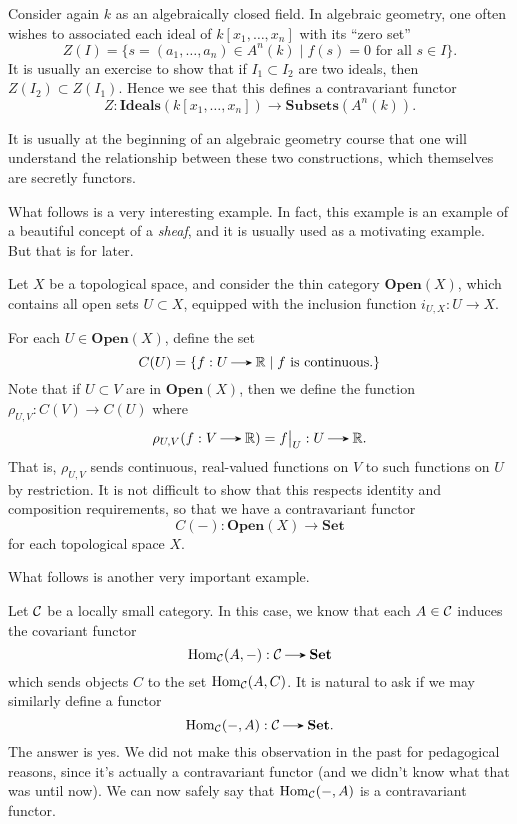     \begin{example}
        Consider again $k$ as an algebraically closed field. In algebraic geometry, 
        one often wishes to associated each ideal of $k[x_1, \dots, x_n]$
        with its ``zero set'' 
        \[
            Z(I) = \bigg\{s = (a_1, \dots, a_n) \in A^n(k) \;\bigg|\; f(s) = 0 \text{ for all } s \in I\bigg\}.
        \]
        It is usually an exercise to show that if $I_1 \subset I_2$ are two ideals, 
        then $Z(I_2) \subset Z(I_1)$. Hence we see that this defines a contravariant functor 
        \[
            Z: \textbf{Ideals}(k[x_1, \dots, x_n]) \to \textbf{Subsets}(A^n(k)).
        \]
    \end{example}

    It is usually at the beginning of an algebraic geometry course that one 
    will understand the relationship between these two constructions, which themselves 
    are secretly functors.

    What follows is a very interesting example. In fact, this example is an example of a 
    beautiful concept of a \emph{sheaf}, and it is usually used as a motivating 
    example. But that is for later. 

    \begin{example}
        Let $X$ be a topological space, and 
        consider the thin category $\textbf{Open}(X)$, which contains
        all open sets $U \subset X$, equipped with the inclusion
        function $i_{U, X}: U \to X$. 

        For each $U \in \textbf{Open}(X)$, define the set
        \[
            C(U) = \{f: U \to \rr \mid f \text{ is continuous.}\}
        \]
        Note that if $U \subset V$ are in $\textbf{Open}(X)$, then 
        we define the function 
        $\rho_{U,V}: C(V) \to C(U)$ where 
        \[
            \rho_{U,V}(f: V \to \rr) = f\big|_{U}: U \to \rr.
        \]
        That is, $\rho_{U,V}$ sends continuous, real-valued functions 
        on $V$ to such functions on $U$ by restriction. 
        It is not difficult to show that this respects identity and composition 
        requirements, so that we have a contravariant functor
        \[
            C(-) : \textbf{Open}(X) \to \textbf{Set}
        \]
        for each topological space $X$. 
    \end{example}

    What follows is another very important example. 

    \begin{example}
        Let $\mathcal{C}$ be a locally small category. In this case, we know that 
        each $A \in \mathcal{C}$ induces the covariant functor
        \[
            \hom_{\cc}(A, -) : \cc \to \textbf{Set}
        \]
        which sends objects $C$ to the set $\operatorname{\mathrm{Hom}}_{\mathcal{C}}(A, C)$. 
        It is natural to ask if we may similarly define a functor  
        \[
            \hom_{\cc}(-, A): \cc \to \textbf{Set}.
        \]
        The answer is yes. We did not make this observation in the past 
        for pedagogical reasons, since it's actually a contravariant functor 
        (and we didn't know what that was until now). We can now safely say 
        that $\operatorname{\mathrm{Hom}}_{\mathcal{C}}(-, A)$ is a contravariant functor. 
    \end{example}

